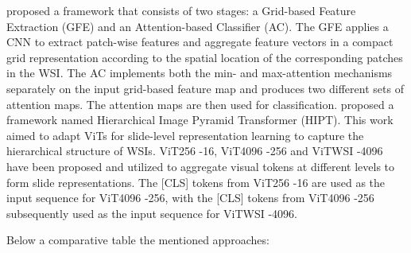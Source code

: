 \documentclass[
11pt, %
english, %
singlespacing, %
headsepline, %
]{project_structure}
\begin{document}
\cite{Gigapixel} proposed a framework that consists of two stages: a Grid-based Feature Extraction (GFE) and an Attention-based Classifier (AC). The GFE applies a CNN to extract patch-wise features and aggregate feature vectors in a compact grid representation according to the spatial location of the corresponding patches in the WSI. The AC implements both the min- and max-attention mechanisms separately on the input grid-based feature map and produces two different sets of attention maps. The attention maps are then used for classification. \cite{HIPT} proposed a framework named  Hierarchical Image Pyramid Transformer (HIPT). This work aimed to adapt ViTs \cite{Vit} for slide-level representation learning to capture the hierarchical structure of WSIs. ViT256 -16, ViT4096 -256 and ViTWSI -4096 have been proposed and utilized to aggregate visual tokens at different levels to form slide representations. The [CLS] tokens from ViT256 -16 are used as the input sequence for ViT4096 -256, with the [CLS] tokens from ViT4096 -256 subsequently used as the input sequence for ViTWSI -4096.

\newpage 
Below a comparative table the mentioned approaches:
\end{document}
